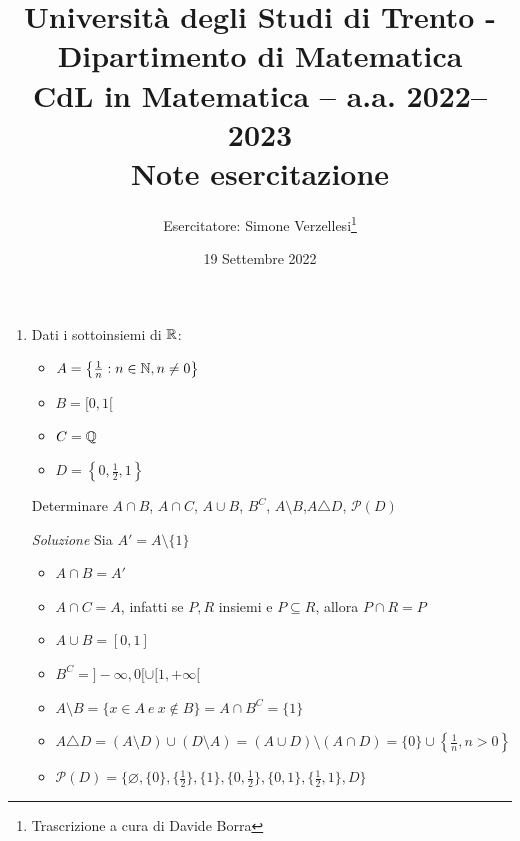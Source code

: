 \documentclass{article}
\title{Università degli Studi di Trento - Dipartimento di Matematica\\
CdL in Matematica – a.a. 2022–2023\\ Note esercitazione}
\author{Esercitatore: Simone Verzellesi\thanks{Trascrizione a cura di Davide Borra}}
\date{19 Settembre 2022}
\begin{document}
\maketitle
{}
\begin{enumerate}[label=\textbf{Esercizio 1.\arabic*.},itemindent=*]
    \item Dati i sottoinsiemi di $\mathbb{R}$:
    \begin{itemize}
        \item $A=\left\{\frac{1}{n}:n\in \mathbb{N}, n\neq 0\right\}$
        \item $B=[0,1[$
        \item $C=\mathbb{Q}$
        \item $D=\left\{0,\frac{1}{2},1\right\}$
    \end{itemize}
    Determinare $A\cap B$, $A\cap C$, $A\cup B$, $B^C$, $A\setminus B$,$A\triangle D$, $\mathcal{P}(D)$
    \item[\textit{\large Soluzione}]
    Sia $A'=A\setminus\{1\}$
    \begin{itemize}
        \item $A\cap B=A'$
        \item $A\cap C=A$, infatti se $P,R$ insiemi e $P\subseteq R$, allora $P\cap R=P$
        \item $A\cup B=[0,1]$
        \item $B^C=]-\infty,0[\cup[1,+\infty[$
        \item $A\setminus B=\{x\in A ~e~ x \notin B\}=A\cap B^C=\{1\}$
        \item $A\triangle D=(A\setminus D)\cup (D\setminus A)=(A\cup D) \setminus (A\cap D)=\{0\}\cup \left\{\frac{1}{n}, n>0\right\}$
        \item $\mathcal{P}(D)=\{\varnothing, \{0\}, \{\frac{1}{2}\}, \{1\}, \{0, \frac{1}{2}\}, \{0,1\}, \{\frac{1}{2}, 1\}, D\}$
    \end{itemize}
    

\end{enumerate}
\end{document}
